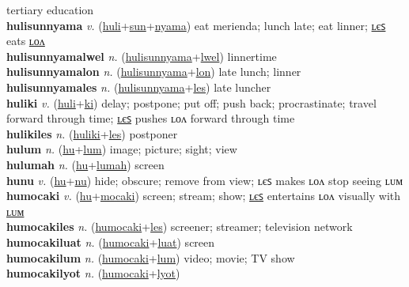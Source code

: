 tertiary education \label{hulinokilwel} \\
\textbf{hulisunnyama} \textit{v.} (\hyperref[huli]{huli}+\hyperref[sun]{sun}+\hyperref[nyama]{nyama})
eat merienda; lunch late; eat linner; \hyperref[hulisunnyamales]{ʟєꜱ} eats \hyperref[hulisunnyamalon]{ʟᴏᴧ} \label{hulisunnyama} \\
\textbf{hulisunnyamalwel} \textit{n.} (\hyperref[hulisunnyama]{hulisunnyama}+\hyperref[lwel]{lwel})
linnertime \label{hulisunnyamalwel} \\
\textbf{hulisunnyamalon} \textit{n.} (\hyperref[hulisunnyama]{hulisunnyama}+\hyperref[lon]{lon})
late lunch; linner \label{hulisunnyamalon} \\
\textbf{hulisunnyamales} \textit{n.} (\hyperref[hulisunnyama]{hulisunnyama}+\hyperref[les]{les})
late luncher \label{hulisunnyamales} \\
\textbf{huliki} \textit{v.} (\hyperref[huli]{huli}+\hyperref[ki]{ki})
delay; postpone; put off; push back; procrastinate; travel forward through time; \hyperref[hulikiles]{ʟєꜱ} pushes ʟᴏᴧ forward through time \label{huliki} \\
\textbf{hulikiles} \textit{n.} (\hyperref[huliki]{huliki}+\hyperref[les]{les})
postponer \label{hulikiles} \\
\textbf{hulum} \textit{n.} (\hyperref[hu]{hu}+\hyperref[lum]{lum})
image; picture; sight; view \label{hulum} \\
\textbf{hulumah} \textit{n.} (\hyperref[hu]{hu}+\hyperref[lumah]{lumah})
screen \label{hulumah} \\
\textbf{hunu} \textit{v.} (\hyperref[hu]{hu}+\hyperref[nu]{nu})
hide; obscure; remove from view; ʟєꜱ makes ʟᴏᴧ stop seeing ʟᴜᴍ \label{hunu} \\
\textbf{humocaki} \textit{v.} (\hyperref[hu]{hu}+\hyperref[mocaki]{mocaki})
screen; stream; show; \hyperref[humocakiles]{ʟєꜱ} entertains ʟᴏᴧ visually with \hyperref[humocakilum]{ʟᴜᴍ} \label{humocaki} \\
\textbf{humocakiles} \textit{n.} (\hyperref[humocaki]{humocaki}+\hyperref[les]{les})
screener; streamer; television network \label{humocakiles} \\
\textbf{humocakiluat} \textit{n.} (\hyperref[humocaki]{humocaki}+\hyperref[luat]{luat})
screen \label{humocakiluat} \\
\textbf{humocakilum} \textit{n.} (\hyperref[humocaki]{humocaki}+\hyperref[lum]{lum})
video; movie; TV show \label{humocakilum} \\
\textbf{humocakilyot} \textit{n.} (\hyperref[humocaki]{humocaki}+\hyperref[lyot]{lyot})
